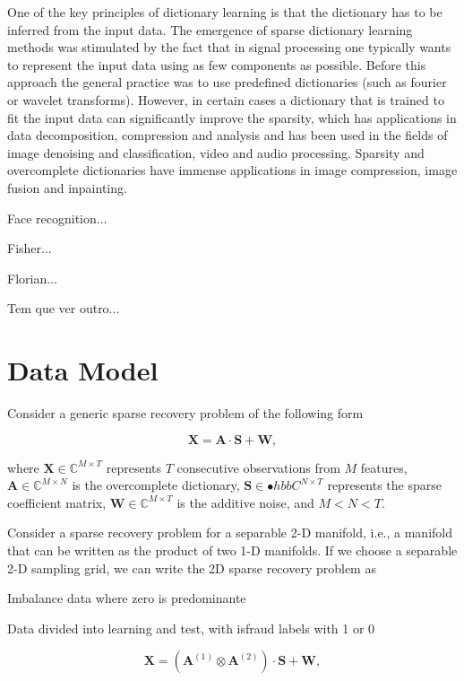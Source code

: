 One of the key principles of dictionary learning is that the dictionary has to be inferred from the input data. The emergence of sparse dictionary learning methods was stimulated by the fact that in signal processing one typically wants to represent the input data using as few components as possible. Before this approach the general practice was to use predefined dictionaries (such as fourier or wavelet transforms). However, in certain cases a dictionary that is trained to fit the input data can significantly improve the sparsity, which has applications in data decomposition, compression and analysis and has been used in the fields of image denoising and classification, video and audio processing. Sparsity and overcomplete dictionaries have immense applications in image compression, image fusion and inpainting.

Face recognition...

Fisher...

Florian...

Tem que ver outro...

\section{Data Model}

Consider a generic sparse recovery problem of the following form

\begin{equation}\label{eq:eq01}
\boldsymbol{X} = \boldsymbol{A} \cdot \boldsymbol{S} + \boldsymbol{W},
\end{equation}

where $\boldsymbol{X} \in \mathbb{C}^{M \times T}$ represents $T$ consecutive observations from $M$ features, $\boldsymbol{A} \in \mathbb{C}^{M \times N}$ is the overcomplete dictionary, $\boldsymbol{S} \in \mathbb{•}hbb{C}^{N \times T}$ represents the sparse coefficient matrix, $\boldsymbol{W} \in \mathbb{C}^{M \times T}$ is the additive noise, and $M < N < T$.

Consider a sparse recovery problem for a separable 2-D manifold, i.e., a manifold that can be written as the product of two 1-D manifolds. If we choose a separable 2-D sampling grid, we can write the 2D sparse recovery problem as

Imbalance data where zero is predominante

Data divided into learning and test, with isfraud labels with 1 or 0

\begin{equation}\label{eq:eq02}
\boldsymbol{X} = (\boldsymbol{A}^{(1)} \otimes \boldsymbol{A}^{(2)}) \cdot \boldsymbol{S} + \boldsymbol{W},
\end{equation}

